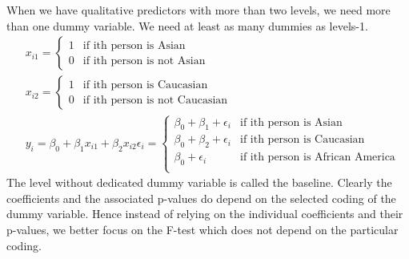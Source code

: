 \documentclass[../document.tex]{subfiles}
\begin{document}
	When we have qualitative predictors with more than two levels, we need more than one dummy variable. We need at least as many dummies as levels-1.
	\begin{equation}
	\begin{split}
	&x_{i1}=\begin{cases}
	1 &\text{if ith person is Asian}\\
	0 &\text{if ith person is not Asian}
	\end{cases}\\
	&x_{i2}=\begin{cases}
	1 &\text{if ith person is Caucasian}\\
	0 &\text{if ith person is not Caucasian}
	\end{cases}\\
	&y_{i} = \beta_{0}+\beta_{1}x_{i1}+\beta_{2}x_{i2}\epsilon_{i}=\begin{cases}
	\beta_{0}+\beta_{1}+\epsilon_{i} &\text{if ith person is Asian}\\
	\beta_{0}+\beta_{2}+\epsilon_{i} &\text{if ith person is Caucasian}\\
	\beta_{0}+\epsilon_{i} &\text{if ith person is African America}\\
	\end{cases}
	\end{split}
	\end{equation}
	The level without dedicated dummy variable is called the baseline. Clearly the coefficients and the associated p-values do depend on the selected coding of the dummy variable. Hence instead of relying on the individual coefficients and their p-values, we better focus on the F-test which does not depend on the particular coding.
\end{document}
